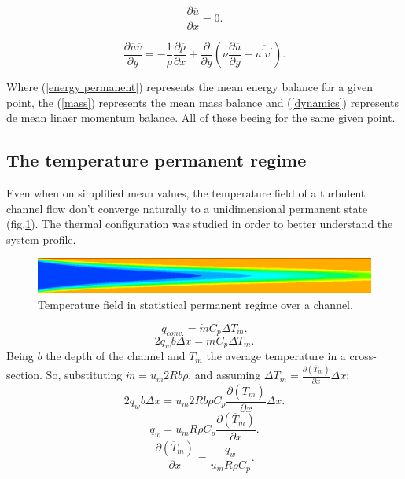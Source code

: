 \documentclass[10pt]{article} %
\begin{document}
\begin{equation}\label{mass}
\frac{\partial \overline{u}}{\partial x} = 0.
\end{equation}

\begin{equation}\label{dynamics}
\frac{\partial \overline{u}\overline{v}}{\partial y} = 
- \frac{1}{\rho} \frac{\partial \overline{p}}{\partial x} + \frac{\partial}{\partial y}\left(\nu \frac{\partial \overline{u}}{\partial y} - \overline{u^\prime v^\prime}\right).
\end{equation}

Where (\ref{energy permanent}) represents the mean energy balance for a given point, the (\ref{mass}) represents the mean mass balance and (\ref{dynamics}) represents de mean linaer momentum balance. All of these beeing for the same given point.

\subsection{The temperature permanent regime}

Even when on simplified mean values, the temperature field of a turbulent channel flow don't converge naturally to a unidimensional permanent state (fig.\ref{figure.2}). The thermal configuration was studied in order to better understand the system profile.
\begin{figure}[h!]
	\centering
	\includegraphics[angle=0, scale=0.40]{temperatura}
	\caption{Temperature field in statistical permanent regime over a channel.}
	\label{figure.2}
\end{figure}
\begin{equation}\label{c_h_e}
q_{conv.} = \dot{m} C_p \Delta T_m.
\end{equation}
\begin{equation}
2q_w b \Delta x = \dot{m} C_p \Delta T_m.
\end{equation}
Being $b$ the depth of the channel and $T_m$ the average temperature in a cross-section. So, substituting $ \dot{m} = u_m 2R b \rho $, and assuming $ \Delta T_m = \frac{\partial{\left(\overline{T}_m\right)}}{\partial{x}} \Delta x $:
\begin{equation}
2q_w b \Delta x = u_m 2R b \rho  C_p \frac{\partial{\left(\overline{T}_m\right)}}{\partial{x}} \Delta x.
\end{equation}     
\begin{equation}
q_w = u_m R \rho  C_p \frac{\partial{\left(\overline{T}_m\right)}}{\partial{x}} .
\end{equation} 
\begin{equation}\label{c_h_ee}
\frac{\partial{\left(\overline{T}_m\right)}}{\partial{x}} = \frac{q_w}{u_m  R \rho  C_p } .
\end{equation} 
\end{document}
